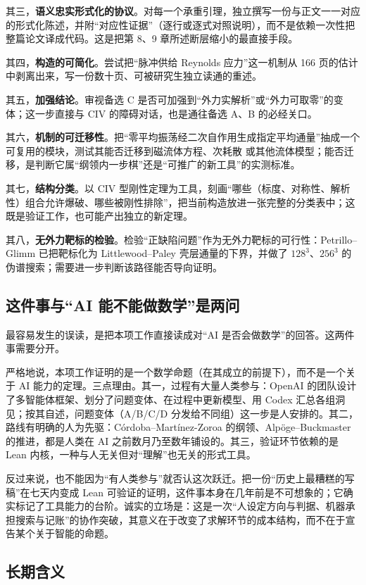 其三，\textbf{语义忠实形式化的协议}。对每一个承重引理，独立撰写一份与正文一一对应的形式化陈述，并附“对应性证据”（逐行或逐式对照说明），而不是依赖一次性把整篇论文译成代码。这是把第 8、9 章所述断层缩小的最直接手段。

其四，\textbf{构造的可简化}。尝试把“脉冲供给 Reynolds 应力”这一机制从 166 页的估计中剥离出来，写一份数十页、可被研究生独立读通的重述。

其五，\textbf{加强结论}。审视备选 C 是否可加强到“外力实解析”或“外力可取零”的变体；这一步直接与 CIV 的障碍对话，也是通往备选 A、B 的必经关口。

其六，\textbf{机制的可迁移性}。把“零平均振荡经二次自作用生成指定平均通量”抽成一个可复用的模块，测试其能否迁移到磁流体方程、次耗散 \NS{} 或其他流体模型；能否迁移，是判断它属“纲领内一步棋”还是“可推广的新工具”的实测标准。

其七，\textbf{结构分类}。以 CIV 型刚性定理为工具，刻画“哪些（标度、对称性、解析性）组合允许爆破、哪些被刚性排除”，把当前构造放进一张完整的分类表中；这既是验证工作，也可能产出独立的新定理。

其八，\textbf{无外力靶标的检验}。检验“正缺陷问题”作为无外力靶标的可行性：Petrillo--Glimm 已把靶标化为 Littlewood--Paley 壳层通量的下界，并做了 $128^{3}$、$256^{3}$ 的伪谱搜索；需要进一步判断该路径能否导向证明。

\subsection{这件事与“AI 能不能做数学”是两问}

最容易发生的误读，是把本项工作直接读成对“AI 是否会做数学”的回答。这两件事需要分开。

严格地说，本项工作证明的是一个数学命题（在其成立的前提下），而不是一个关于 AI 能力的定理。三点理由。其一，过程有大量人类参与：OpenAI 的团队设计了多智能体框架、划分了问题变体、在过程中更新模型、用 Codex 汇总各组洞见；按其自述，问题变体（A/B/C/D 分发给不同组）这一步是人安排的。其二，路线有明确的人为先驱：Córdoba--Martínez-Zoroa 的纲领、Alpöge--Buckmaster 的推进，都是人类在 AI 之前数月乃至数年铺设的。其三，验证环节依赖的是 Lean 内核，一种与人无关但对“理解”也无关的形式工具。

反过来说，也不能因为“有人类参与”就否认这次跃迁。把一份“历史上最糟糕的写稿”在七天内变成 Lean 可验证的证明，这件事本身在几年前是不可想象的；它确实标记了工具能力的台阶。诚实的立场是：这是一次“人设定方向与判据、机器承担搜索与记账”的协作突破，其意义在于改变了求解环节的成本结构，而不在于宣告某个关于智能的命题。

\subsection{长期含义}

